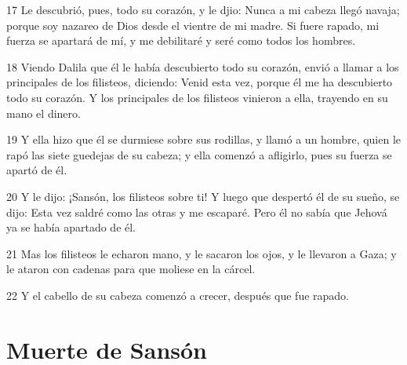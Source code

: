 \par 17 Le descubrió, pues, todo su corazón, y le djio: Nunca a mi cabeza llegó navaja; porque soy nazareo de Dios desde el vientre de mi madre. Si fuere rapado, mi fuerza se apartará de mí, y me debilitaré y seré como todos los hombres.
\par 18 Viendo Dalila que él le había descubierto todo su corazón, envió a llamar a los principales de los filisteos, diciendo: Venid esta vez, porque él me ha descubierto todo su corazón. Y los principales de los filisteos vinieron a ella, trayendo en su mano el dinero.
\par 19 Y ella hizo que él se durmiese sobre sus rodillas, y llamó a un hombre, quien le rapó las siete guedejas de su cabeza; y ella comenzó a afligirlo, pues su fuerza se apartó de él.
\par 20 Y le dijo: ¡Sansón, los filisteos sobre ti! Y luego que despertó él de su sueño, se dijo: Esta vez saldré como las otras y me escaparé. Pero él no sabía que Jehová ya se había apartado de él.
\par 21 Mas los filisteos le echaron mano, y le sacaron los ojos, y le llevaron a Gaza; y le ataron con cadenas para que moliese en la cárcel.
\par 22 Y el cabello de su cabeza comenzó a crecer, después que fue rapado.

\section*{Muerte de Sansón}

